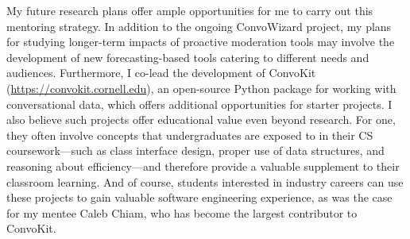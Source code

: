 \documentclass[12pt,letterpaper]{article}
\newcommand\ugradclosing\laresearchclosing
\newcommand\ugradclosing\genresearchclosing
\begin{document}
My future research plans offer ample opportunities for me to carry out this mentoring strategy.
In addition to the ongoing ConvoWizard project, my plans for studying longer-term impacts of proactive moderation tools may involve the development of new forecasting-based tools catering to different needs and audiences.
Furthermore, I co-lead the development of ConvoKit (\url{https://convokit.cornell.edu}), an open-source Python package for working with conversational data, which offers additional opportunities for starter projects.
I also believe such projects offer educational value even beyond research.
For one, they often involve concepts that undergraduates are exposed to in their CS coursework---such as class interface design, proper use of data structures, and reasoning about efficiency---and therefore provide a valuable supplement to their classroom learning.
And of course, students interested in industry careers can use these projects to gain valuable software engineering experience, as was the case for my mentee Caleb Chiam, who has become the largest contributor to ConvoKit.
\ugradclosing

\vspace{0.5\baselineskip}
\printbibliography
\end{document}

